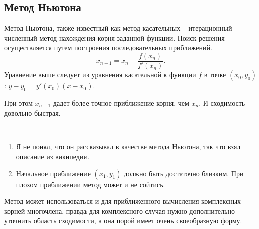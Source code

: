 \documentclass[12pt, a4paper]{article}
\begin{document}
    \subsection{Метод Ньютона}
    \begin{definition}
        Метод Ньютона, также известный как метод касательных -- итерационный численный метод нахождения корня заданной функции. Поиск решения осуществляется путем построения последовательных приближений.\[
            x_{n+1} = x_{n} - \frac{f(x_{n})}{f'(x_{n})}.
        \] Уравнение выше следует из уравнения касательной к функции \( f \) в точке \( (x_{0}, y_{0}) \): \( y - y_{0} = y'(x_{0})(x - x_{0}) \).
    \end{definition}
    При этом \( x_{n+1} \) дадет более точное приближение корня, чем \( x_{n} \). И сходимость довольно быстрая.
    \begin{figure}[H]
    \end{figure}
    \begin{rem}
        \(  \)
    \begin{enumerate}
        \item Я не понял, что он рассказывал в качестве метода Ньютона, так что взял описание из википедии.
        \item Начальное приближение \( (x_{1}, y_{1}) \) должно быть достаточно близким. При плохом приближении метод может и не сойтись.  
    \end{enumerate}
    \end{rem}
    Метод может использоваться и для приближенного вычисления комплексных корней многочлена, правда для комплексного случая нужно дополнительно уточнить область сходимости, а она порой имеет очень своеобразную форму.
\end{document}
